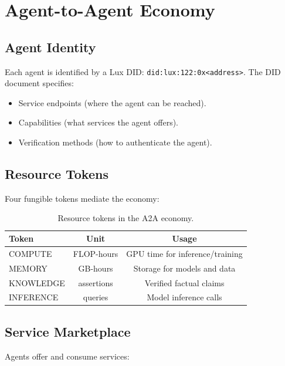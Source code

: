 \documentclass[11pt,letterpaper]{article}
\begin{document}
\section{Agent-to-Agent Economy}

\subsection{Agent Identity}

Each agent is identified by a Lux DID: \texttt{did:lux:122:0x<address>}. The DID document specifies:

\begin{itemize}
    \item Service endpoints (where the agent can be reached).
    \item Capabilities (what services the agent offers).
    \item Verification methods (how to authenticate the agent).
\end{itemize}

\subsection{Resource Tokens}

Four fungible tokens mediate the economy:

\begin{table}[t]
\centering
\begin{tabular}{lcc}
\toprule
\textbf{Token} & \textbf{Unit} & \textbf{Usage} \\
\midrule
COMPUTE & FLOP-hours & GPU time for inference/training \\
MEMORY & GB-hours & Storage for models and data \\
KNOWLEDGE & assertions & Verified factual claims \\
INFERENCE & queries & Model inference calls \\
\bottomrule
\end{tabular}
\caption{Resource tokens in the A2A economy.}
\label{tab:tokens}
\end{table}

\subsection{Service Marketplace}

Agents offer and consume services:
\end{document}
